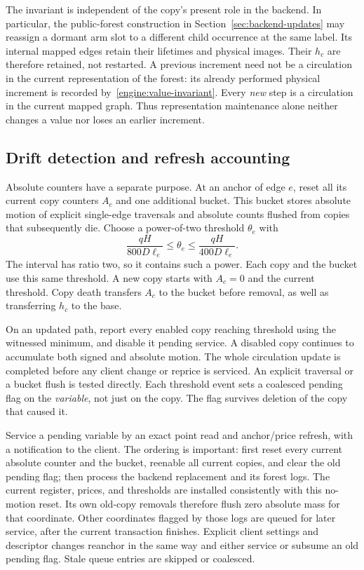 The invariant is independent of the copy's present role in the backend.
In particular, the public-forest construction in
Section~\ref{sec:backend-updates} may reassign a dormant arm slot to a
different child occurrence at the same label.  Its internal mapped edges
retain their lifetimes and physical images.  Their $h_c$ are therefore
retained, not restarted.  A previous increment need not be a circulation
in the current representation of the forest: its already performed
physical increment is recorded by~\eqref{engine:value-invariant}.
Every \emph{new} step is a circulation in the current mapped graph.
Thus representation maintenance alone neither changes a value nor loses
an earlier increment.

\subsection{Drift detection and refresh accounting}\label{engine:refresh}

Absolute counters have a separate purpose.  At an anchor of edge $e$,
reset all its current copy counters $A_c$ and one additional bucket.
This bucket stores absolute motion of explicit single-edge traversals
and absolute counts flushed from copies that subsequently die.  Choose
a power-of-two threshold $\theta_e$ with
\begin{equation}\label{engine:threshold}
          \frac{qH}{800D\ell_e}\le\theta_e
                          \le\frac{qH}{400D\ell_e}.
\end{equation}
The interval has ratio two, so it contains such a power.  Each copy
and the bucket use this same threshold.  A new copy starts
with $A_c=0$ and the current threshold.  Copy death transfers $A_c$ to
the bucket before removal, as well as transferring $h_c$ to the base.

On an updated path, report every enabled copy reaching threshold using
the witnessed minimum, and disable it pending service.  A disabled copy
continues to accumulate both signed and absolute motion.  The whole
circulation update is completed before any client change or reprice is
serviced.  An explicit traversal or a bucket flush is tested directly.
Each threshold event sets a coalesced pending flag on the \emph{variable},
not just on the copy.  The flag survives deletion of the copy that
caused it.

Service a pending variable by an exact point read and anchor/price
refresh, with a notification to the client.  The ordering is important:
first reset every current absolute counter and the bucket, reenable all
current copies, and clear the old pending flag; then process the backend
replacement and its forest logs.  The current register, prices, and
thresholds are installed consistently with this no-motion reset.  Its
own old-copy removals therefore flush zero absolute mass for that
coordinate.  Other coordinates flagged by those logs are queued for
later service, after the current transaction finishes.  Explicit client
settings and descriptor changes reanchor in the same way and either
service or subsume an old pending flag.  Stale queue entries are skipped
or coalesced.


